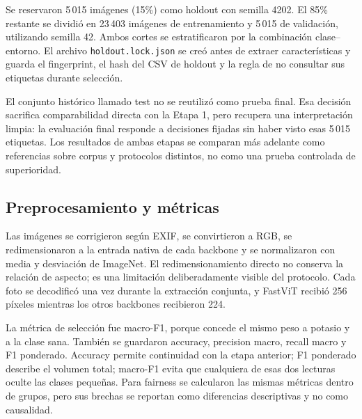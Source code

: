 Se reservaron 5\,015 imágenes (15\%) como holdout con semilla 4202. El 85\%
restante se dividió en 23\,403 imágenes de entrenamiento y 5\,015 de
validación, utilizando semilla 42. Ambos cortes se estratificaron por la
combinación clase--entorno. El archivo \texttt{holdout.lock.json} se creó antes
de extraer características y guarda el fingerprint, el hash del CSV de holdout
y la regla de no consultar sus etiquetas durante selección.

El conjunto histórico llamado test no se reutilizó como prueba final. Esa
decisión sacrifica comparabilidad directa con la Etapa 1, pero recupera una
interpretación limpia: la evaluación final responde a decisiones fijadas sin
haber visto esas 5\,015 etiquetas. Los resultados de ambas etapas se comparan
más adelante como referencias sobre corpus y protocolos distintos, no como
una prueba controlada de superioridad.

\subsection{Preprocesamiento y métricas}

Las imágenes se corrigieron según EXIF, se convirtieron a RGB, se redimensionaron
a la entrada nativa de cada backbone y se normalizaron con media y desviación
de ImageNet. El redimensionamiento directo no conserva la relación de aspecto;
es una limitación deliberadamente visible del protocolo. Cada foto se decodificó
una vez durante la extracción conjunta, y FastViT recibió 256 píxeles mientras
los otros backbones recibieron 224.

La métrica de selección fue macro-F1, porque concede el mismo peso a potasio y
a la clase sana. También se guardaron accuracy, precision macro, recall macro
y F1 ponderado. Accuracy permite continuidad con la etapa anterior; F1
ponderado describe el volumen total; macro-F1 evita que cualquiera de esas dos
lecturas oculte las clases pequeñas. Para fairness se calcularon las mismas
métricas dentro de grupos, pero sus brechas se reportan como diferencias
descriptivas y no como causalidad.
